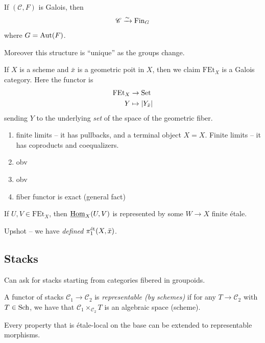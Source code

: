 \documentclass[11pt]{amsart}
\providecommand{\FEt}{\mathrm{FEt}}
\begin{document}
\begin{theorem} If $(\mathscr{C},F)$ is Galois, then
\begin{align*}
    \mathscr{C} \xrightarrow{\sim} \mathrm{Fin}_G
\end{align*}
where $G = \mathrm{Aut}(F)$.
\end{theorem}
Moreover this structure is ``unique'' as the groups change.

\begin{example} If $X$ is a scheme and $\bar{x}$ is a geometric poit in $X$, then we claim $\FEt_X$ is a Galois category. Here the functor is
\begin{align*}
    \FEt_X &\to \Set \\
    Y &\mapsto \left| Y_{\bar{x}} \right|
\end{align*}
sending $Y$ to the underlying \textit{set} of the space of the geometric fiber.
\begin{enumerate}
    \item finite limits -- it has pullbacks, and a terminal object $X = X$. Finite limits -- it has coproducts and coequalizers.
    \item obv
    \item obv
    \item fiber functor is exact (general fact)
\end{enumerate}
\end{example}

\begin{lemma} If $U,V\in \FEt_X$, then $\underline{\mathrm{Hom}}_X(U,V)$ is represented by some $W \to X$ finite \'etale.
\end{lemma}

Upshot -- we have \textit{defined} $\pi_1^{\text{\'{e}t}}(X,\bar{x})$.

\subsection{Stacks}

Can ask for stacks starting from categories fibered in groupoids.

\begin{definition} A functor of stacks $\mathscr{C}_1 \to \mathscr{C}_2$ is \emph{representable (by schemes)} if for any $T \to \mathscr{C}_2$ with $T\in \mathrm{Sch}$, we have that $\mathscr{C}_1 \times_{\mathscr{C}_2}T$ is an algebraic space (scheme).
\end{definition}

\begin{remark} Every property that is \'etale-local on the base can be extended to representable morphisms.
\end{remark}
\end{document}

